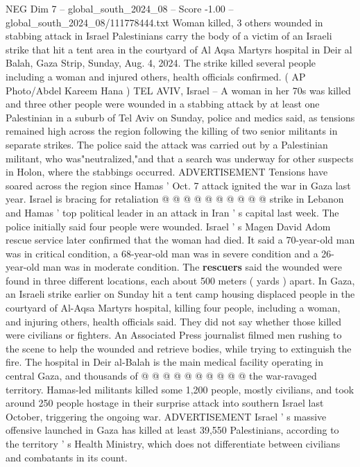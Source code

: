 \begin{textsample}{NEG Dim 7 – global\_south\_2024\_08 – Score -1.00 – global\_south\_2024\_08/111778444.txt}  \label{ex:f7_neg_278}
Woman killed, 3 others wounded in stabbing attack in Israel Palestinians carry the body of a victim of an Israeli strike that hit a tent area in the courtyard of Al Aqsa Martyrs hospital in Deir al Balah, Gaza Strip, Sunday, Aug. 4, 2024.
The strike killed several people including a woman and injured others, health officials confirmed. ( AP Photo/Abdel Kareem Hana ) TEL AVIV, Israel -- A woman in her 70s was killed and three other people were wounded in a stabbing attack by at least one Palestinian in a suburb of Tel Aviv on Sunday, police and medics said, as tensions remained high across the region following the killing of two senior militants in separate strikes.
The police said the attack was carried out by a Palestinian militant, who was"neutralized,"and that a search was underway for other suspects in Holon, where the stabbings occurred.
ADVERTISEMENT Tensions have soared across the region since Hamas ' Oct. 7 attack ignited the war in Gaza last year.
Israel is bracing for retaliation @ @ @ @ @ @ @ @ @ @ strike in Lebanon and Hamas ' top political leader in an attack in Iran ' s capital last week.
The police initially said four people were wounded.
Israel ' s Magen David Adom rescue service later confirmed that the woman had died.
It said a 70-year-old man was in critical condition, a 68-year-old man was in severe condition and a 26-year-old man was in moderate condition.
The \textbf{rescuers} said the wounded were found in three different locations, each about 500 meters ( yards ) apart.
In Gaza, an Israeli strike earlier on Sunday hit a tent camp housing displaced people in the courtyard of Al-Aqsa Martyrs hospital, killing four people, including a woman, and injuring others, health officials said.
They did not say whether those killed were civilians or fighters.
An Associated Press journalist filmed men rushing to the scene to help the wounded and retrieve bodies, while trying to extinguish the fire.
The hospital in Deir al-Balah is the main medical facility operating in central Gaza, and thousands of @ @ @ @ @ @ @ @ @ @ the war-ravaged territory.
Hamas-led militants killed some 1,200 people, mostly civilians, and took around 250 people hostage in their surprise attack into southern Israel last October, triggering the ongoing war.
ADVERTISEMENT Israel ' s massive offensive launched in Gaza has killed at least 39,550 Palestinians, according to the territory ' s Health Ministry, which does not differentiate between civilians and combatants in its count.

\end{textsample}
